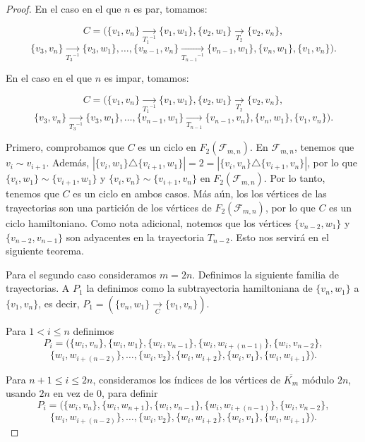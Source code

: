 \begin{proof}
    En el caso en el que $n$ es par, tomamos:

    \[
        C=(\{v_1,v_n\} \xrightarrow[{T_1}^{-1}]{}\{v_1,w_1\},\{v_2,w_1\}
        \xrightarrow[T_2]{}\{v_2,v_n\},\]
        \[\{v_3,v_n\} \xrightarrow[{T_3}^{-1}]{}\{v_3,w_1\},\dots,
        \{v_{n-1},v_n\}\xrightarrow[{T_{n-1}}^{-1}]{}\{v_{n-1},w_1\},\{v_n,w_1\},\{v_1,v_n\}).
    \]

    En el caso en el que $n$ es impar, tomamos:

    \[
        C=(\{v_1,v_n\} \xrightarrow[{T_1}^{-1}]{}\{v_1,w_1\},\{v_2,w_1\}
    \xrightarrow[T_2]{}\{v_2,v_n\},\]
    \[\{v_3,v_n\} \xrightarrow[{T_3}^{-1}]{}\{v_3,w_1\},\dots, \{v_{n-1},w_1\}
    \xrightarrow[T_{n-1}]{}\{v_{n-1},v_n\},\{v_n,w_1\},\{v_1,v_n\}).
    \]
    
    Primero, comprobamos que $C$ es un ciclo en $F_2(\mathcal{F}_{m,n})$. En
    $\mathcal{F}_{m,n}$, tenemos que $v_i \sim v_{i+1}$. Adem\'as,
    $|\{v_i,w_1\}\triangle \{v_{i+1},w_1\}|=2 =|\{v_i,v_n\}\triangle
    \{v_{i+1},v_n\}|$, por lo que $\{v_i,w_1\}\sim \{v_{i+1},w_1\}$ y
    $\{v_i,v_n\}\sim \{v_{i+1},v_n\}$ en $F_2(\mathcal{F}_{m,n})$. Por lo tanto,
    tenemos que $C$ es un ciclo en ambos casos. M\'as a\'un, los los v\'ertices
    de las trayectorias son una partici\'on de los v\'ertices de
    $F_2(\mathcal{F}_{m,n})$, por lo que $C$ es un ciclo hamiltoniano. Como nota
    adicional, notemos que los v\'ertices $\{v_{n-2},w_1\}$ y
    $\{v_{n-2},v_{n-1}\}$ son adyacentes en la trayectoria $T_{n-2}$. Esto nos
    servir\'a en el siguiente teorema.

    Para el segundo caso consideramos $m=2n$. Definimos la siguiente familia de
    trayectorias. A $P_1$ la definimos como la subtrayectoria hamiltoniana de
    $\{v_n,w_1\}$ a $\{v_1,v_n\}$, es decir, $P_1= (\{v_n,w_1\}
    \xrightarrow[C]{}\{v_1,v_n\})$. 
    
    Para $1 < i \leq n$ definimos
    \[
        P_i=(\{w_i,v_n\},\{w_i,w_1\},\{w_i,v_{n-1}\},\{w_i,w_{i+(n-1)}\},\{w_i,v_{n-2}\},\]
        \[\{w_i,w_{i+(n-2)}\},\dots,\{w_i,v_2\},\{w_i,w_{i+2}\},\{w_i,v_1\},\{w_i,w_{i+1}\}).
    \]
    
    Para $n+1\leq i \leq 2n$, consideramos los \'indices de los v\'ertices de
    $\overline{K_m}$ m\'odulo $2n$, usando $2n$ en vez de $0$, para definir 
    \[
        P_i= (\{w_i,v_n\}, \{w_i,w_{n+1}\}, \{w_i,v_{n-1}\}, \{w_i,w_{i+(n-1)}\},
        \{w_i,v_{n-2}\},\]
        \[\{w_i,w_{i+(n-2)}\}, \dots, \{w_i,v_2\}, \{w_i,w_{i+2}\},
        \{w_i,v_1\}, \{w_i,w_{i+1}\}).
    \]


\end{proof}
